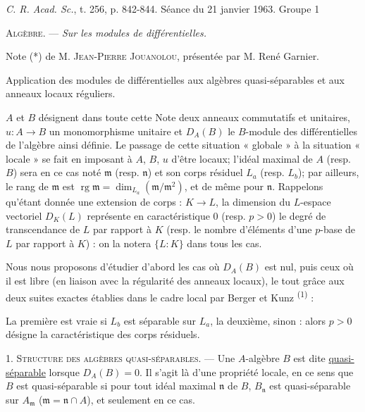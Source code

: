 \textit{C. R. Acad. Sc.}, t. 256, p. 842-844. \hfill Séance du 21 janvier 1963. \hfill Groupe 1

\textsc{Algèbre.} --- \textit{Sur les modules de différentielles.}

Note (*) de M. \textsc{Jean-Pierre Jouanolou}, présentée par M. René Garnier.

Application des modules de différentielles aux algèbres quasi-séparables et aux anneaux locaux réguliers.

$A$ et $B$ désignent dans toute cette Note deux anneaux commutatifs et unitaires, $u:A\to B$ un monomorphisme unitaire et $D_A(B)$ le $B$-module des différentielles de l'algèbre ainsi définie. Le passage de cette situation « globale » à la situation « locale » se fait en imposant à $A$, $B$, $u$ d'être locaux; l'idéal maximal de $A$ (resp. $B$) sera en ce cas noté $\mathfrak m$ (resp. $\mathfrak n$) et son corps résiduel $L_a$ (resp. $L_b$); par ailleurs, le rang de $\mathfrak m$ est $\operatorname{rg}\mathfrak m=\dim_{L_a}(\mathfrak m/\mathfrak m^2)$, et de même pour $\mathfrak n$. Rappelons qu'étant donnée une extension de corps : $K\to L$, la dimension du $L$-espace vectoriel $D_K(L)$ représente en caractéristique $0$ (resp. $p>0$) le degré de transcendance de $L$ par rapport à $K$ (resp. le nombre d'éléments d'une $p$-base de $L$ par rapport à $K$) : on la notera $\{L:K\}$ dans tous les cas.

Nous nous proposons d'étudier d'abord les cas où $D_A(B)$ est nul, puis ceux où il est libre (en liaison avec la régularité des anneaux locaux), le tout grâce aux deux suites exactes établies dans le cadre local par Berger et Kunz \textsuperscript{(1)} :



La première est vraie si $L_b$ est séparable sur $L_a$, la deuxième, sinon : alors $p>0$ désigne la caractéristique des corps résiduels.

1. \textsc{Structure des algèbres quasi-séparables.} --- Une $A$-algèbre $B$ est dite \uline{quasi-séparable} lorsque $D_A(B)=0$. Il s'agit là d'une propriété locale, en ce sens que $B$ est quasi-séparable si pour tout idéal maximal $\mathfrak n$ de $B$, $B_{\mathfrak n}$ est quasi-séparable sur $A_{\mathfrak m}$ ($\mathfrak m=\mathfrak n\cap A$), et seulement en ce cas.

